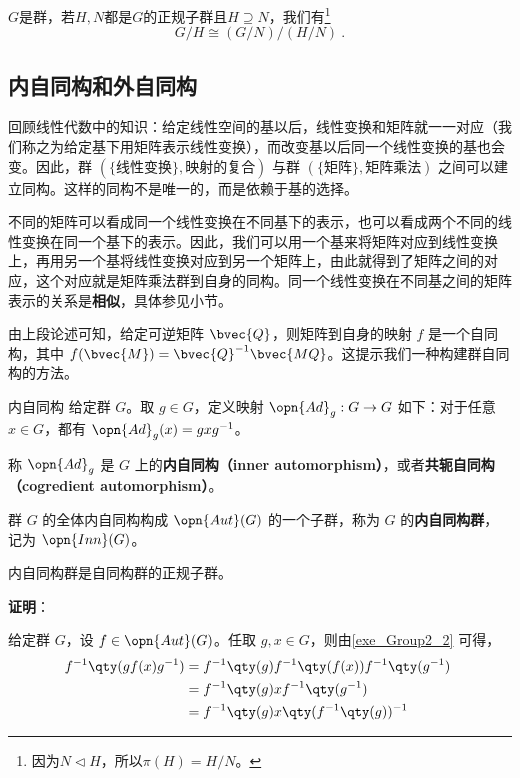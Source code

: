 \begin{corollary}{}
$G$是群，若$H,N$都是$G$的正规子群且$H\supseteq N$，我们有\footnote{因为$N\lhd H$，所以$\pi(H)=H/N$。}
\begin{equation}G/H\cong (G/N)/(H/N)~.\end{equation}
\end{corollary}


\subsection{内自同构和外自同构}



回顾线性代数中的知识：给定线性空间的基以后，线性变换和矩阵就一一对应（我们称之为给定基下用矩阵表示线性变换），而改变基以后同一个线性变换的基也会变。因此，群 $(\{\text{线性变换}\}, \text{映射的复合})$ 与群 $(\{\text{矩阵}\}, \text{矩阵乘法})$ 之间可以建立同构。这样的同构不是唯一的，而是依赖于基的选择。

不同的矩阵可以看成同一个线性变换在不同基下的表示，也可以看成两个不同的线性变换在同一个基下的表示。因此，我们可以用一个基来将矩阵对应到线性变换上，再用另一个基将线性变换对应到另一个矩阵上，由此就得到了矩阵之间的对应，这个对应就是矩阵乘法群到自身的同构。同一个线性变换在不同基之间的矩阵表示的关系是\textbf{相似}，具体参见小节。

由上段论述可知，给定可逆矩阵 $\bvec{Q}$，则矩阵到自身的映射 $f$ 是一个自同构，其中 $f(\bvec{M})=\bvec{Q}^{-1}\bvec{MQ}$。这提示我们一种构建群自同构的方法。

\begin{definition}{内自同构}
给定群 $G$。取 $g\in G$，定义映射 $\opn{Ad}_g:G\to G$ 如下：对于任意 $x\in G$，都有 $\opn{Ad}_g(x)=gxg^{-1}$。

称 $\opn{Ad}_g$ 是 $G$ 上的\textbf{内自同构（inner automorphism）}，或者\textbf{共轭自同构（cogredient automorphism）}。


群 $G$ 的全体内自同构构成 $\opn{Aut}(G)$ 的一个子群，称为 $G$ 的\textbf{内自同构群}， 记为 $\opn{Inn}(G)$。

\end{definition}

\begin{theorem}{}\label{the_Group2_1}
内自同构群是自同构群的正规子群。
\end{theorem}

\textbf{证明}：

给定群 $G$，设 $f\in \opn{Aut}(G)$。任取 $g, x\in G$，则由\autoref{exe_Group2_2} 可得，
\begin{equation}\label{eq_Group2_1}
\begin{aligned}
f^{-1}\qty(gf(x)g^{-1})&=f^{-1}\qty(g)f^{-1}\qty(f(x))f^{-1}\qty(g^{-1})\\
&=f^{-1}\qty(g)xf^{-1}\qty(g^{-1})\\
&=f^{-1}\qty(g)x\qty(f^{-1}\qty(g))^{-1}
\end{aligned}~
\end{equation}

